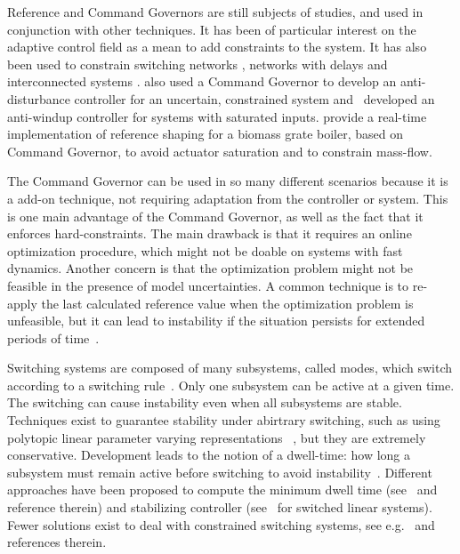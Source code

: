 Reference and Command Governors are still subjects of studies, and used in
conjunction with other techniques. It has been of particular interest on the
adaptive control field
\parencite{arabi.yucelen.ea:command,ristevski.dogan.ea:transient,wilcher.jaramillo.ea:on,dogan.yucelen.ea:improving,gruenwald.yucelen.ea:expanded,makavita.jayasinghe.ea:experimental}
as a mean to add constraints to the system. It has also been used to constrain
switching networks \parencite{ong.djamari.ea:governor}, networks with delays
\parencite{shen.song.ea:constrained} and interconnected systems
\parencite{tedesco.casavola:turn-based}. \textcite{peng.wang.ea:constrained}
also used a Command Governor to develop an anti-disturbance controller for an
uncertain, constrained system
and~\textcite{schwerdtner.bortoff.ea:projection-based} developed an anti-windup
controller for systems with saturated inputs.
\textcite{seeber.golles.ea:reference} provide a real-time implementation of
reference shaping for a biomass grate boiler, based on Command Governor, to
avoid actuator saturation and to constrain mass-flow.

The Command Governor can be used in so many different scenarios because it is a
add-on technique, not requiring adaptation from the controller or system. This
is one main advantage of the Command Governor, as well as the fact that it
enforces hard-constraints. The main drawback is that it requires an online
optimization procedure, which might not be doable on systems with fast dynamics.
Another concern is that the optimization problem might not be feasible in the
presence of model uncertainties. A common technique is to re-apply the last
calculated reference value when the optimization problem is unfeasible, but it
can lead to instability if the situation persists for extended periods of
time~\parencite{garone.di-cairano.ea:reference}.

Switching systems are composed of many subsystems, called modes, which switch
according to a switching
rule~\parencite{liberzon:switching,liberzon.morse:basic}. Only one subsystem can
be active at a given time. The switching can cause instability even when all
subsystems are stable. Techniques exist to guarantee stability under abirtrary
switching, such as using polytopic linear parameter varying
representations~\parencite{deaecto.geromel.ea:robust} , but they are extremely
conservative. Development leads to the notion of a dwell-time: how long a
subsystem must remain active before switching to avoid
instability~\parencite{liberzon.morse:basic}. Different approaches have been
proposed to compute the minimum dwell time
(see~\parencite{chesi.colaneri.ea:computing} and reference therein) and
stabilizing controller (see~\parencite{lin.antsaklis:stability} for switched
linear systems). Fewer solutions exist to deal with constrained switching
systems, see e.g.~\parencite{franzè.lucia.ea:command,lucia.franzè:stabilization}
and references therein.

